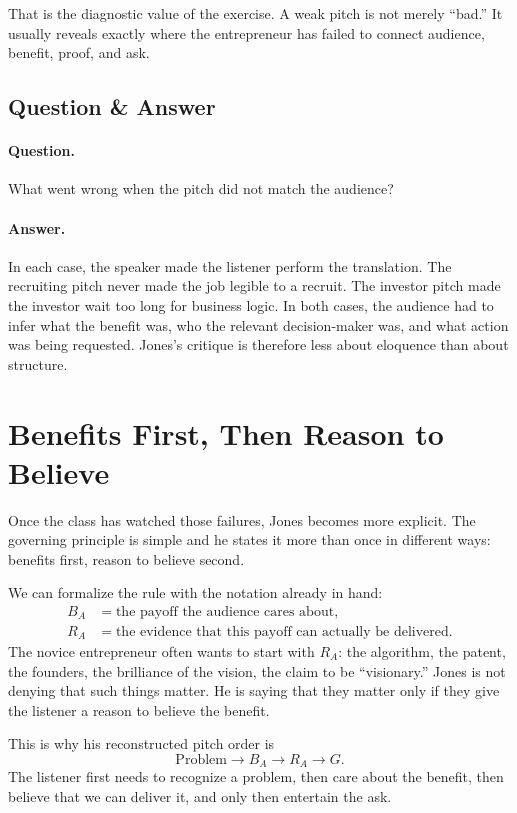That is the diagnostic value of the exercise. A weak pitch is not merely ``bad.'' It usually reveals exactly where the entrepreneur has failed to connect audience, benefit, proof, and ask.

\subsection{Question \& Answer}

\paragraph{Question.} What went wrong when the pitch did not match the audience?

\paragraph{Answer.} In each case, the speaker made the listener perform the translation. The recruiting pitch never made the job legible to a recruit. The investor pitch made the investor wait too long for business logic. In both cases, the audience had to infer what the benefit was, who the relevant decision-maker was, and what action was being requested. Jones's critique is therefore less about eloquence than about structure.

\section{Benefits First, Then Reason to Believe}

Once the class has watched those failures, Jones becomes more explicit. The governing principle is simple and he states it more than once in different ways: benefits first, reason to believe second.

We can formalize the rule with the notation already in hand:
\begin{align}
B_A &= \text{the payoff the audience cares about},\\
R_A &= \text{the evidence that this payoff can actually be delivered}.
\end{align}
The novice entrepreneur often wants to start with \(R_A\): the algorithm, the patent, the founders, the brilliance of the vision, the claim to be ``visionary.'' Jones is not denying that such things matter. He is saying that they matter only if they give the listener a reason to believe the benefit.

This is why his reconstructed pitch order is
\begin{equation}
\text{Problem} \to B_A \to R_A \to G.
\end{equation}
The listener first needs to recognize a problem, then care about the benefit, then believe that we can deliver it, and only then entertain the ask.

